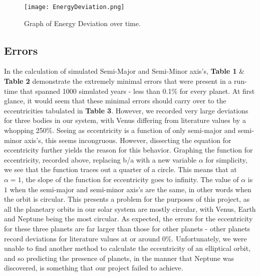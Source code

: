 \documentclass[a4paper,12pt]{article} %
\numberwithin{equation}{section} %
\numberwithin{figure}{section} %
\begin{document}
\begin{figure}[h]
\centering
\texttt{[image: EnergyDeviation.png]}
\caption{Graph of Energy Deviation over time.}
\end{figure}


\subsection{Errors}

In the calculation of simulated Semi-Major and Semi-Minor axis's, \textbf{Table 1} & \textbf{Table 2} demonstrate the extremely minimal errors that were present in a run-time that spanned 1000 simulated years - less than 0.1\% for every planet. At first glance, it would seem that these minimal errors should carry over to the eccentricities tabulated in \textbf{Table 3}. However, we recorded very large deviations for three bodies in our system, with Venus differing from literature values by a whopping 250\%. Seeing as eccentricity is a function of only semi-major and semi-minor axis's, this seems incongruous. However, dissecting the equation for eccentricity further yields the reason for this behavior. Graphing the function for eccentricity, recorded above, replacing b/a with a new variable $\alpha$ for simplicity, we see that the function traces out a quarter of a circle. This means that at $\alpha = 1$, the slope of the function for eccentricity goes to infinity. The value of $\alpha$ is $1$ when the semi-major and semi-minor axis's are the same, in other words when the orbit is circular. This presents a problem for the purposes of this project, as all the planetary orbits in our solar system are mostly circular, with Venus, Earth and Neptune being the most circular. As expected, the errors for the eccentricity for these three planets are far larger than those for other planets - other planets record deviations for literature values at or around $0\%$. Unfortunately, we were unable to find another method to calculate the eccentricity of an elliptical orbit, and so predicting the presence of planets, in the manner that Neptune was discovered, is something that our project failed to achieve. 
\end{document}
